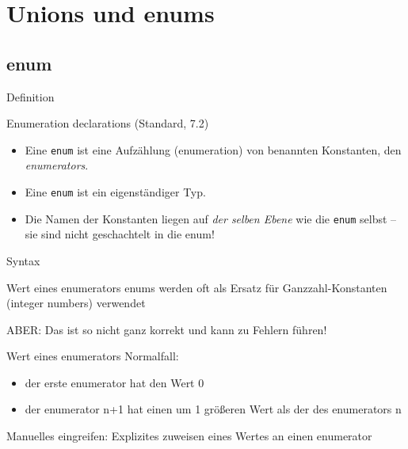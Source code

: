 \section{Unions und enums}


\subsection{enum}

\begin{frame}[fragile]{Definition}
	\begin{block}{Enumeration declarations (Standard, 7.2)}
		\begin{itemize}
			\item Eine \verb|enum| ist eine Aufzählung (enumeration) von benannten Konstanten, den \emph{enumerators}.
			\item Eine \verb|enum| ist ein eigenständiger Typ.
			\item Die Namen der Konstanten liegen auf \emph{der selben Ebene} wie die \verb|enum| selbst -- \alert{sie sind nicht geschachtelt in die enum!}
		\end{itemize}
	\end{block}
	
	\pause
	\footnotesize
	
	\begin{block}{Syntax}
		
	\end{block}
\end{frame}

\begin{frame}{Wert eines enumerators}
	enums werden oft als Ersatz für Ganzzahl-Konstanten (integer numbers) verwendet
	
	ABER: Das ist so nicht ganz korrekt und kann zu Fehlern führen!
	
	\pause
	
	\begin{block}{Wert eines enumerators}
		Normalfall:
		\begin{itemize}
			\item der erste enumerator hat den Wert 0
			\item der enumerator n+1 hat einen um 1 größeren Wert als der des enumerators n
		\end{itemize}
		
		\pause
		
		Manuelles eingreifen: Explizites zuweisen eines Wertes an einen enumerator
		
		\footnotesize
		
	\end{block}
\end{frame}


